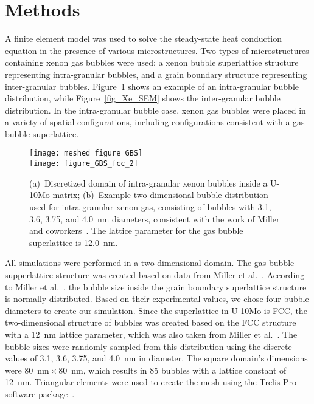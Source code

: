 \section{Methods} \label{sec:Methodology}
A finite element model was used to solve the steady-state heat conduction equation in the presence of various microstructures. Two types of microstructures containing xenon gas bubbles were used: a xenon bubble superlattice structure representing intra-granular bubbles, and a grain boundary structure representing inter-granular bubbles. Figure~\ref{gbs} shows an example of an intra-granular bubble distribution, while Figure~\ref{fig_Xe_SEM} shows the inter-granular bubble distribution.
In the intra-granular bubble case, xenon gas bubbles were placed in a variety
of spatial configurations, including configurations consistent with a gas bubble superlattice.
\begin{figure}%
    \centering
	  \texttt{[image: meshed\_figure\_GBS]}
    \\
	 \texttt{[image: figure\_GBS\_fcc\_2]}
	\caption[Discretized domain of intra-granular xenon bubbles]{(a)~Discretized domain of intra-granular xenon bubbles inside a U-10Mo matrix; (b)~Example two-dimensional bubble distribution 
used for intra-granular xenon gas, consisting of bubbles with 3.1, 3.6, 3.75,
        and 4.0~nm diameters, consistent with the work of Miller and
        coworkers~\cite{miller2015transmission}. The lattice parameter for the
        gas bubble superlattice is 12.0~nm.}
	\label{gbs}
\end{figure}
All simulations were performed in a two-dimensional domain. The gas bubble supperlattice structure was created based on data from Miller et al.~\cite{miller2015transmission}. According to Miller et al.~\cite{miller2015transmission}, the bubble size inside the grain boundary superlattice structure is normally distributed. Based on their experimental values, we chose four bubble diameters to create our simulation. Since the superlattice in U-10Mo is FCC, the two-dimensional structure of bubbles was created based on the FCC structure with a 12~nm lattice parameter, which was also taken from Miller et al.~\cite{miller2015transmission}. The bubble sizes were randomly sampled from this distribution using the discrete values of 3.1, 3.6, 3.75, and 4.0~nm in diameter. The square domain's dimensions were 80~nm${}\times{}$80~nm, which results in 85 bubbles with a lattice constant of 12~nm. Triangular elements were used to create the mesh using the Trelis Pro software package~\cite{trelis}.


